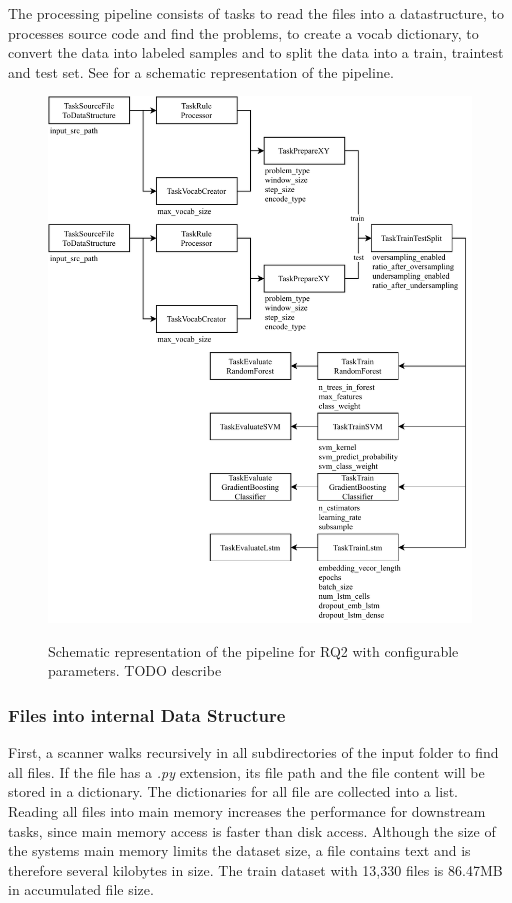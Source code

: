 The processing pipeline consists of tasks to read the files into a datastructure, to processes source code and find the problems, to create a vocab dictionary, to convert the data into labeled samples and to split the data into a train, traintest and test set. See  for a schematic representation of the pipeline.

\begin{figure}
    \includegraphics[width=1\textwidth]{img/ML/Pipeline_RQ2.pdf}
    \label{fig:pipeline_rq2}
    \caption[Schematic representation of the pipeline for RQ2 with configurable parameters.]{Schematic representation of the pipeline for RQ2 with configurable parameters. TODO describe}
\end{figure}


\subsubsection{Files into internal Data Structure}
First, a scanner walks recursively in all subdirectories of the input folder to find all files. If the file has a \textit{.py} extension, its file path and the file content will be stored in a dictionary. The dictionaries for all file are collected into a list. 
Reading all files into main memory increases the performance for downstream tasks, since main memory access is faster than disk access. Although the size of the systems main memory limits the dataset size, a file contains text and is therefore several kilobytes in size. The train dataset with 13,330 files is 86.47MB in accumulated file size.

